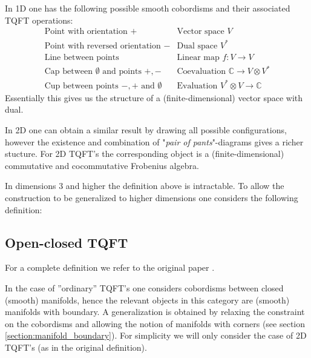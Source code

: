 	\begin{example}[1D]
		In 1D one has the following possible smooth cobordisms and their associated TQFT operations:
		\begin{equation*}
			\begin{array}{l|l}
				\text{Point with orientation } + & \text{Vector space } V\\
				\text{Point with reversed orientation } - & \text{Dual space } V^*\\
				\text{Line between points} & \text{Linear map } f:V\rightarrow V\\
				\text{Cap between $\emptyset$ and points } +, - & \text{Coevaluation } \mathbb{C}\rightarrow V\otimes V^*\\
				\text{Cup between points $-, +$ and }\emptyset & \text{Evaluation } V^*\otimes V\rightarrow\mathbb{C}
			\end{array}
		\end{equation*}
		Essentially this gives us the structure of a (finite-dimensional) vector space with dual.
	\end{example}
	
	\begin{example}[2D]
		In 2D one can obtain a similar result by drawing all possible configurations, however the existence and combination of "\textit{pair of pants}"-diagrams gives a richer stucture. For 2D TQFT's the corresponding object is a (finite-dimensional) commutative and cocommutative Frobenius algebra.
	\end{example}
	
	In dimensions 3 and higher the definition above is intractable. To allow the construction to be generalized to higher dimensions one considers the following definition:
	
\subsection{Open-closed TQFT}

	For a complete definition we refer to the original paper \cite{open_closed}.
	
	In the case of ''ordinary'' TQFT's one considers cobordisms between closed (smooth) manifolds, hence the relevant objects in this category are (smooth) manifolds with boundary. A generalization is obtained by relaxing the constraint on the cobordisms and allowing the notion of manifolds with corners (see section \ref{section:manifold_boundary}). For simplicity we will only consider the case of 2D TQFT's (as in the original definition).
